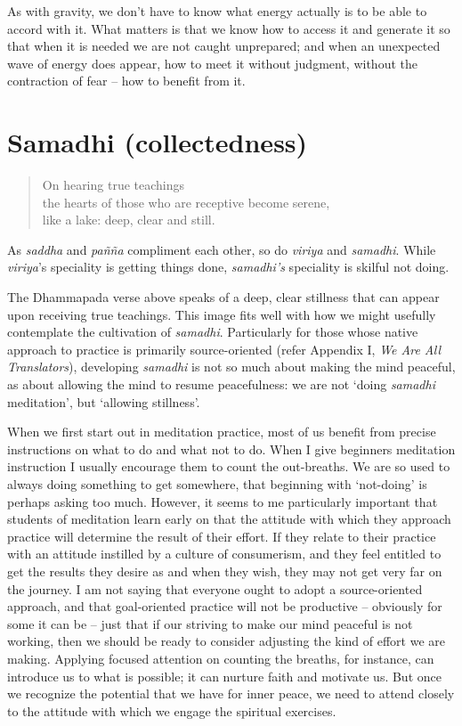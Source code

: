 As with gravity, we don't have to know what energy actually is to be
able to accord with it. What matters is that we know how to access it
and generate it so that when it is needed we are not caught unprepared;
and when an unexpected wave of energy does appear, how to meet it
without judgment, without the contraction of fear -- how to benefit from
it.

\section{Samadhi (collectedness)}

\begin{quote}
  On hearing true teachings\\
  the hearts of those who are receptive become serene,\\
  like a lake: deep, clear and still.

\end{quote}

As \emph{saddha} and \emph{pañña} compliment each other, so do
\emph{viriya} and \emph{samadhi}. While \emph{viriya}'s speciality is
getting things done, \emph{samadhi's} speciality is skilful not doing.

The Dhammapada verse above speaks of a deep, clear stillness that can
appear upon receiving true teachings. This image fits well with how we
might usefully contemplate the cultivation of \emph{samadhi}.
Particularly for those whose native approach to practice is primarily
source-oriented (refer Appendix I, \emph{We Are All Translators}),
developing \emph{samadhi} is not so much about making the mind peaceful,
as about allowing the mind to resume peacefulness: we are not `doing
\emph{samadhi} meditation', but `allowing stillness'.

When we first start out in meditation practice, most of us benefit from
precise instructions on what to do and what not to do. When I give
beginners meditation instruction I usually encourage them to count the
out-breaths. We are so used to always doing something to get somewhere,
that beginning with `not-doing' is perhaps asking too much. However, it
seems to me particularly important that students of meditation learn
early on that the attitude with which they approach practice will
determine the result of their effort. If they relate to their practice
with an attitude instilled by a culture of consumerism, and they feel
entitled to get the results they desire as and when they wish, they may
not get very far on the journey. I am not saying that everyone ought to
adopt a source-oriented approach, and that goal-oriented practice will
not be productive -- obviously for some it can be -- just that if our
striving to make our mind peaceful is not working, then we should be
ready to consider adjusting the kind of effort we are making. Applying
focused attention on counting the breaths, for instance, can introduce
us to what is possible; it can nurture faith and motivate us. But once
we recognize the potential that we have for inner peace, we need to
attend closely to the attitude with which we engage the spiritual
exercises.

